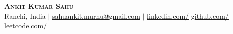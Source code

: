 \begin{center}
  \textbf{\Huge \scshape Ankit Kumar Sahu} \\
  \small Ranchi, India $|$ \href{mailto:sahuankit.murhu@gmail.com}{\underline{sahuankit.murhu@gmail.com}} $|$
  \href{https://www.linkedin.com/in/kmrankitt/}{\underline{linkedin.com/}}
  \href{https://github.com/kmr-ankitt}{\underline{github.com/}}
  \href{https://leetcode.com/u/kmrankit/}{\underline{leetcode.com/}}
\end{center}
